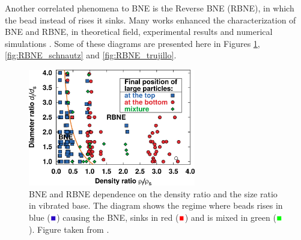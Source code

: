     Another correlated phenomena to BNE is the Reverse BNE (RBNE), in which the bead instead of rises it sinks. Many works enhanced the characterization of BNE and RBNE, in theoretical field, experimental results and numerical simulations \cite{A_Horizontal_Brazil-Nut_Effect_and_Its_Reverse, Brazil-nut_effect_versus_reverse_Brazil-nut_effect_in_a_moderately_dense_granular_fluid, Categorization_of_Brazil_nut_and_its_reverse_under_less-convective_conditions_for_microgravity_geology, Competition_of_Brazil_nut_effect_buoyancy_and_inelasticity_induced_segregation_in_a_granular_mixture, Reverse_Brazil_Nut_Problem_Competition_between_Percolation_and_Condensation, Reverse_buoyancy_in_a_vibrated_granular_bed_Computer_Simulations, Reversing_the_Brazil-Nut_Effect_Competition_between_Percolation_and_Condensation, Segregation_in_a_fluidized_binary_granular_mixture_Competition_between_buoyancy_and_geometric_forces, Simple_model_for_reverse_buoyancy_in_a_vibrated_granular_system, Hydrodynamic_theory_for_reverse_brazil_nut_segregation_and_the_non-monotonic_ascension_dynamics}. Some of these diagrams are presented here in Figures \ref{fig:RBNE_breu}, \ref{fig:RBNE_schnautz} and \ref{fig:RBNE_trujillo}.

\begin{figure}
    \centering
    \includegraphics[width=0.65\textwidth]{04-figuras/BNE_Breu.png}
    \caption[Phase diagram of BNE/RBNE from experiment: density ratio and size ratio.]{BNE and RBNE dependence on the density ratio and the size ratio in vibrated base. The diagram shows the regime where beads rises in blue ($\textcolor{blue}{\blacksquare}$) causing the BNE, sinks in red ($\textcolor{red}{\blacksquare}$) and is mixed in green ($\textcolor{green}{\blacksquare}$). Figure taken from \cite{Reversing_the_Brazil-Nut_Effect_Competition_between_Percolation_and_Condensation}.}
    \label{fig:RBNE_breu}
\end{figure}

